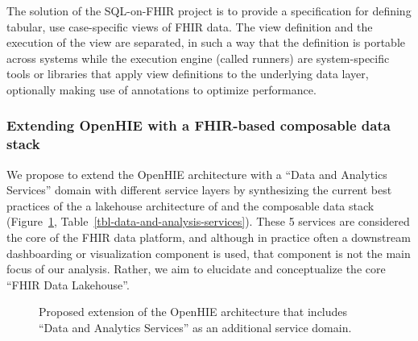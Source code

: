 \documentclass[
  authoryear]{elsarticle}
\begin{document}
The solution of the SQL-on-FHIR project is to provide a specification
for defining tabular, use case-specific views of FHIR data. The view
definition and the execution of the view are separated, in such a way
that the definition is portable across systems while the execution
engine (called runners) are system-specific tools or libraries that
apply view definitions to the underlying data layer, optionally making
use of annotations to optimize performance.

\subsubsection{Extending OpenHIE with a FHIR-based composable data
stack}\label{extending-openhie-with-a-fhir-based-composable-data-stack}

We propose to extend the OpenHIE architecture with a ``Data and
Analytics Services'' domain with different service layers by
synthesizing the current best practices of the a lakehouse architecture
of \citep{hai2023data, harby2022data, harby2024data} and the composable
data stack \citep{pedreira2023composable} (Figure~\ref{fig-ohie},
Table~\ref{tbl-data-and-analysis-services}). These 5 services are
considered the core of the FHIR data platform, and although in practice
often a downstream dashboarding or visualization component is used, that
component is not the main focus of our analysis. Rather, we aim to
elucidate and conceptualize the core ``FHIR Data Lakehouse''.

\begin{figure}


\caption{\label{fig-ohie}Proposed extension of the OpenHIE architecture
that includes ``Data and Analytics Services'' as an additional service
domain.}

\end{figure}%
\end{document}
